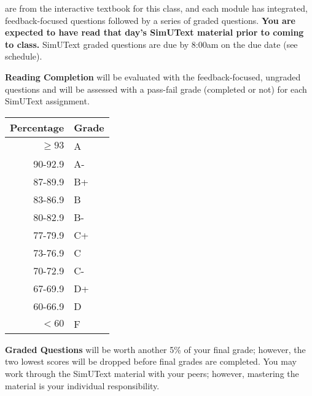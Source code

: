 \documentclass{tufte-handout}
\begin{document}
are from the interactive textbook for this class, and each module has integrated, feedback-focused questions followed by a series of graded questions. \textbf{You are expected to have read that day's SimUText material prior to coming to class. } SimUText graded questions are due by 8:00am on the due date (see schedule).

\textbf{Reading Completion} will be evaluated with the feedback-focused, ungraded questions and will be assessed with a pass-fail grade (completed or not) for each SimUText assignment. 

\begin{margintable}
\begin{tabular}{rl}
Percentage & Grade \\
\hline 
$\ge93$ & A \\
90-92.9 & A- \\
87-89.9 & B+ \\
83-86.9 & B \\
80-82.9 & B- \\
77-79.9 & C+ \\
73-76.9 & C \\
70-72.9 & C- \\
67-69.9 & D+ \\
60-66.9 & D \\
$<60$ & F \\
\hline
\end{tabular}
\end{margintable}


\textbf{Graded Questions} will be worth another 5\% of your final grade; however, the two lowest scores will be dropped before final grades are completed. You may work through the SimUText material with your peers; however, mastering the material is your individual responsibility.
\end{document}
